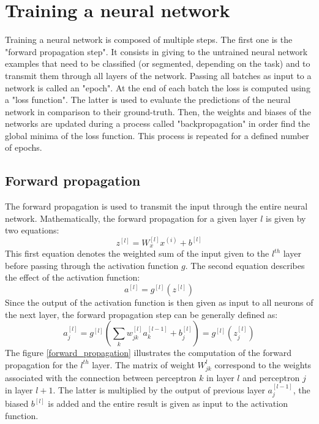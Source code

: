 \section{Training a neural network}
\label{training_a_neural_network}
Training a neural network is composed of multiple steps. The first one is the "forward propagation step". It consists in giving to the untrained neural network examples that need to be classified (or segmented, depending on the task) and to transmit them through all layers of the network. Passing all batches as input to a network is called an "epoch". At the end of each batch the loss is computed using a "loss function". The latter is used to evaluate the predictions of the neural network in comparison to their ground-truth. Then, the weights and biases of the networks are updated during a process called "backpropagation" in order find the global minima of the loss function. This process is repeated for a defined number of epochs.



\subsection{Forward propagation}
The forward propagation is used to transmit the input through the entire neural network. Mathematically, the forward propagation for a given layer $l$ is given by two equations:
\begin{equation}
z^{[l]} = W_{x}^{[l]}x^{(i)} + b^{[l]}
\end{equation}
This first equation denotes the weighted sum of the input given to the $l^{th}$ layer before passing through the activation function $g$. The second equation describes the effect of the activation function:
\begin{equation}
a^{[l]} = g^{[l]}(z^{[l]})
\end{equation}
Since the output of the activation function is then given as input to all neurons of the next layer, the forward propagation step can be generally defined as:
\begin{equation}
a_{j}^{[l]} = g^{[l]} (\sum_{k} w_{jk}^{[l]}a_{k}^{[l-1]} + b_{j}^{[l]}) = g^{[l]} (z_{j}^{[l]}) 
\end{equation}
The figure \ref{forward_propagation} illustrates the computation of the forward propagation for the $l^{th}$ layer. The matrix of weight $W_{jk}^{l}$ correspond to the weights associated with the connection between perceptron $k$ in layer $l$ and perceptron $j$ in layer $l+1$. The latter is multiplied by the output of previous layer $a_{j}^{[l-1]}$, the biased $b^{[l]}$ is added and the entire result is given as input to the activation function.

